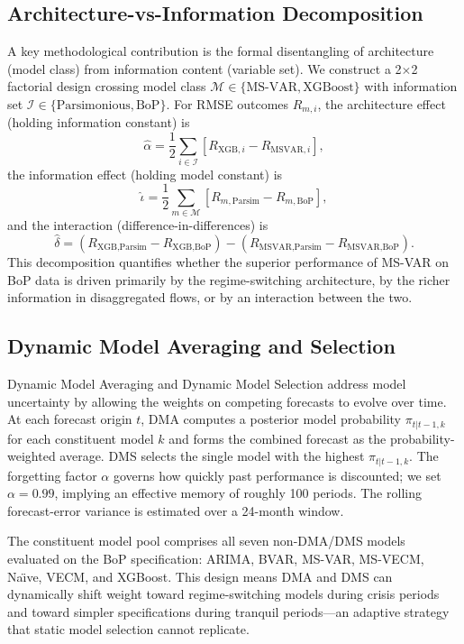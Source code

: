 \documentclass[12pt,a4paper]{article}
\begin{document}
\subsection{Architecture-vs-Information Decomposition}

A key methodological contribution is the formal disentangling of architecture (model class) from information content (variable set). We construct a 2$\times$2 factorial design crossing model class $\mathcal{M} \in \{\text{MS-VAR}, \text{XGBoost}\}$ with information set $\mathcal{I} \in \{\text{Parsimonious}, \text{BoP}\}$. For RMSE outcomes $R_{m,i}$, the architecture effect (holding information constant) is
\[
\hat{\alpha} = \frac{1}{2}\sum_{i \in \mathcal{I}} \left[ R_{\text{XGB},i} - R_{\text{MSVAR},i} \right],
\]
the information effect (holding model constant) is
\[
\hat{\iota} = \frac{1}{2}\sum_{m \in \mathcal{M}} \left[ R_{m,\text{Parsim}} - R_{m,\text{BoP}} \right],
\]
and the interaction (difference-in-differences) is
\[
\hat{\delta} = \left(R_{\text{XGB,Parsim}} - R_{\text{XGB,BoP}}\right) - \left(R_{\text{MSVAR,Parsim}} - R_{\text{MSVAR,BoP}}\right).
\]
This decomposition quantifies whether the superior performance of MS-VAR on BoP data is driven primarily by the regime-switching architecture, by the richer information in disaggregated flows, or by an interaction between the two.

\subsection{Dynamic Model Averaging and Selection}

Dynamic Model Averaging and Dynamic Model Selection \citep{Raftery2010,KoopKorobilis2012} address model uncertainty by allowing the weights on competing forecasts to evolve over time. At each forecast origin $t$, DMA computes a posterior model probability $\pi_{t|t-1,k}$ for each constituent model $k$ and forms the combined forecast as the probability-weighted average. DMS selects the single model with the highest $\pi_{t|t-1,k}$. The forgetting factor $\alpha$ governs how quickly past performance is discounted; we set $\alpha = 0.99$, implying an effective memory of roughly 100 periods. The rolling forecast-error variance is estimated over a 24-month window.

The constituent model pool comprises all seven non-DMA/DMS models evaluated on the BoP specification: ARIMA, BVAR, MS-VAR, MS-VECM, Na\"{\i}ve, VECM, and XGBoost. This design means DMA and DMS can dynamically shift weight toward regime-switching models during crisis periods and toward simpler specifications during tranquil periods---an adaptive strategy that static model selection cannot replicate.
\end{document}
